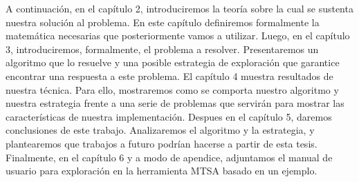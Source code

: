A continuación, en el capítulo 2, introduciremos la teoría sobre la cual se 
sustenta nuestra 
solución al problema. 
En este capítulo definiremos formalmente la matemática necesarias que 
posteriormente vamos a utilizar. Luego, en el capítulo 3, introduciremos, 
formalmente, el problema a resolver. Presentaremos un algoritmo que lo resuelve 
y una posible estrategia de exploración que garantice encontrar una respuesta a 
este problema. El capítulo 4 muestra resultados de nuestra técnica.
Para ello, mostraremos como se comporta nuestro algoritmo y nuestra estrategia 
frente a una serie de problemas que servirán para mostrar las características 
de nuestra implementación. Despues en el capítulo 5, daremos conclusiones de 
este trabajo. Analizaremos el algoritmo y la estrategia, y plantearemos que 
trabajos a futuro podrían hacerse a partir de esta tesis. 
Finalmente, en el capítulo 6 y a modo de apendice, adjuntamos el manual de 
usuario para exploración en la herramienta MTSA basado en un ejemplo.
